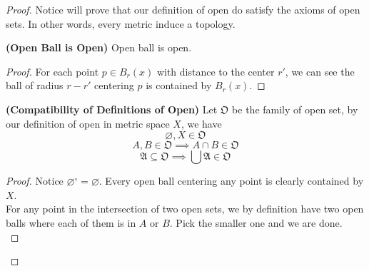 \documentclass{report}
\begin{document}
\begin{proof}
{\begin{minipage}{39em}
Notice  will prove that our definition of open do satisfy the axioms of open sets. In other words, every metric induce a topology. 
\end{minipage}}
\begin{theorem}
\label{1.5.5}
\textbf{(Open Ball is Open)} Open ball is open.
\end{theorem}
\begin{proof}
  For each point $p\in B_r(x)$ with distance to the center $r'$, we can see the ball of radius  $r-r'$ centering $p$ is contained by $B_r(x)$.
\end{proof}
\begin{theorem}
\label{1.5.6}
\textbf{(Compatibility of Definitions of Open)} 
Let $\mathfrak{O}$ be the family of open set, by our definition of open in metric space $X$, we have
 \begin{equation}
\varnothing , X \in \mathfrak{O}
\end{equation}
\begin{equation}
A, B \in \mathfrak{O}\implies A\cap B\in \mathfrak{O}
\end{equation}
\begin{equation}
\mathfrak{A}\subseteq \mathfrak{O}\implies \bigcup \mathfrak{A}\in\mathfrak{O}
\end{equation}
\end{theorem}
\begin{proof}
Notice $\varnothing^\circ =\varnothing$. Every open ball centering any point is clearly contained by $X$.\\

For any point in the intersection of two open sets, we by definition have two open balls where each of them is in $A$ or $B$. Pick the smaller one and we are done.\\


\end{proof}
\end{proof}
\end{document}
